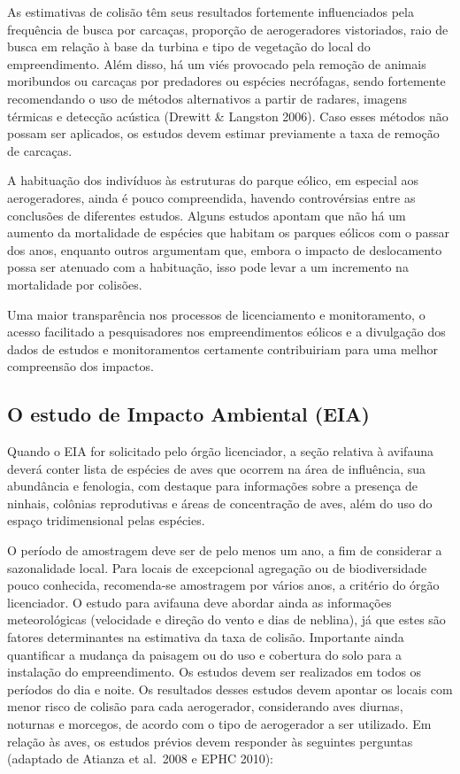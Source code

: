 \documentclass[
]{scrbook}
\begin{document}
As estimativas de colisão têm seus resultados fortemente influenciados pela frequência de busca por carcaças, proporção de aerogeradores vistoriados, raio de busca em relação à base da turbina e tipo de vegetação do local do empreendimento. Além disso, há um viés provocado pela remoção de animais moribundos ou carcaças por predadores ou espécies necrófagas, sendo fortemente recomendando o uso de métodos alternativos a partir de radares, imagens térmicas e detecção acústica (Drewitt \& Langston 2006). Caso esses métodos não possam ser aplicados, os estudos devem estimar previamente a taxa de remoção de carcaças.

A habituação dos indivíduos às estruturas do parque eólico, em especial aos aerogeradores, ainda é pouco compreendida, havendo controvérsias entre as conclusões de diferentes estudos. Alguns estudos apontam que não há um aumento da mortalidade de espécies que habitam os parques eólicos com o passar dos anos, enquanto outros argumentam que, embora o impacto de deslocamento possa ser atenuado com a habituação, isso pode levar a um incremento na mortalidade por colisões.

Uma maior transparência nos processos de licenciamento e monitoramento, o acesso facilitado a pesquisadores nos empreendimentos eólicos e a divulgação dos dados de estudos e monitoramentos certamente contribuiriam para uma melhor compreensão dos impactos.

\hypertarget{EIA}{%
\subsection{O estudo de Impacto Ambiental (EIA)}\label{EIA}}

Quando o EIA for solicitado pelo órgão licenciador, a seção relativa à avifauna deverá conter lista de espécies de aves que ocorrem na área de influência, sua abundância e fenologia, com destaque para informações sobre a presença de ninhais, colônias reprodutivas e áreas de concentração de aves, além do uso do espaço tridimensional pelas espécies.

O período de amostragem deve ser de pelo menos um ano, a fim de considerar a sazonalidade local. Para locais de excepcional agregação ou de biodiversidade pouco conhecida, recomenda-se amostragem por vários anos, a critério do órgão licenciador. O estudo para avifauna deve abordar ainda as informações meteorológicas (velocidade e direção do vento e dias de neblina), já que estes são fatores determinantes na estimativa da taxa de colisão. Importante ainda quantificar a mudança da paisagem ou do uso e cobertura do solo para a instalação do empreendimento. Os estudos devem ser realizados em todos os períodos do dia e noite. Os resultados desses estudos devem apontar os locais com menor risco de colisão para cada aerogerador, considerando aves diurnas, noturnas e morcegos, de acordo com o tipo de aerogerador a ser utilizado. Em relação às aves, os estudos prévios devem responder às seguintes perguntas (adaptado de Atianza et al.~2008 e EPHC 2010):
\end{document}
